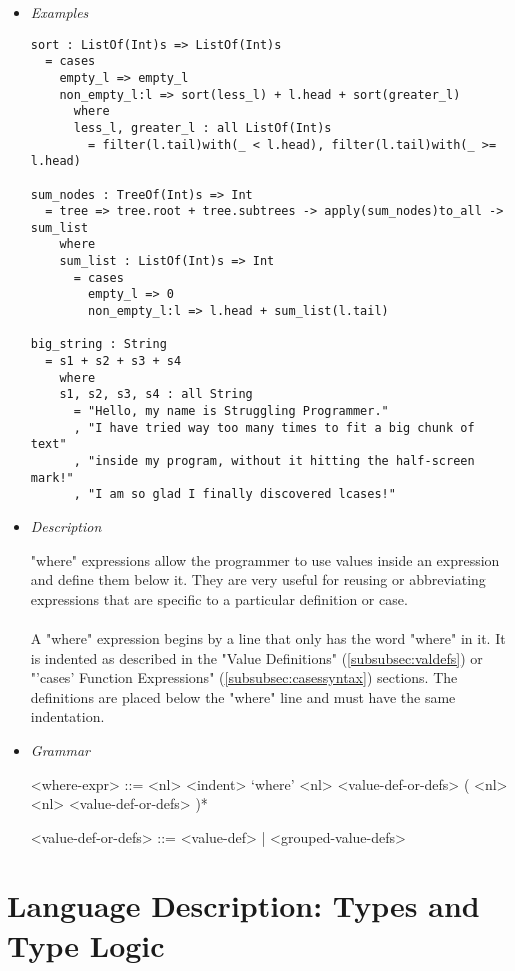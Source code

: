 \documentclass{article}
\begin{document}
\begin{itemize}

\item \textit{Examples}
\begin{verbatim}
sort : ListOf(Int)s => ListOf(Int)s
  = cases
    empty_l => empty_l
    non_empty_l:l => sort(less_l) + l.head + sort(greater_l)
      where
      less_l, greater_l : all ListOf(Int)s
        = filter(l.tail)with(_ < l.head), filter(l.tail)with(_ >= l.head)

sum_nodes : TreeOf(Int)s => Int
  = tree => tree.root + tree.subtrees -> apply(sum_nodes)to_all -> sum_list
    where
    sum_list : ListOf(Int)s => Int
      = cases
        empty_l => 0
        non_empty_l:l => l.head + sum_list(l.tail)

big_string : String
  = s1 + s2 + s3 + s4
    where
    s1, s2, s3, s4 : all String
      = "Hello, my name is Struggling Programmer."
      , "I have tried way too many times to fit a big chunk of text"
      , "inside my program, without it hitting the half-screen mark!"
      , "I am so glad I finally discovered lcases!"
\end{verbatim}

\item \textit{Description}

"where" expressions allow the programmer to use values inside an expression and
define them below it. They are very useful for reusing or abbreviating
expressions that are specific to a particular definition or case.
\\\\
A "where" expression begins by a line that only has the word "where" in it. It is
indented as described in the "Value Definitions" (\ref{subsubsec:valdefs}) or
"'cases' Function Expressions" (\ref{subsubsec:casessyntax}) sections.  The
definitions are placed below the "where" line and must have the same
indentation. 

\item \textit{Grammar}
\begin{grammar}
<where-expr> ::=
<nl> <indent> `where' <nl> <value-def-or-defs> ( <nl> <nl> <value-def-or-defs> )*

<value-def-or-defs> ::= <value-def> | <grouped-value-defs> 
\end{grammar}

\end{itemize}

\section{Language Description: Types and Type Logic}
\end{document}
